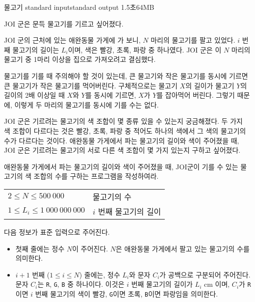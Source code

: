 \begin{problem}{물고기}
	{standard input}{standard output}
	{1.5초}{64MB}{}
	
	JOI 군은 문득 물고기를 기르고 싶어졌다.
	
	JOI 군의 근처에 있는 애완동물 가게에 가 보니, $N$ 마리의 물고기를 팔고 있었다. $i$ 번째 물고기의 길이는 $L_i$이며, 색은 빨강, 초록, 파랑 중 하나였다. JOI 군은 이 $N$ 마리의 물고기 중 1마리 이상을 집으로 가져오려고 결심했다.
	
	물고기를 기를 때 주의해야 할 것이 있는데, 큰 물고기와 작은 물고기를 동시에 기르면 큰 물고기가 작은 물고기를 먹어버린다. 구체적으로는 물고기 $X$의 길이가 물고기 $Y$의 길이의 2배 이상일 때 $X$와 $Y$를 동시에 기르면, $X$가 $Y$를 잡아먹어 버린다. 그렇기 때문에, 이렇게 두 마리의 물고기를 동시에 기를 수는 없다.
	
	JOI 군은 기르려는 물고기의 색 조합이 몇 종류 있을 수 있는지 궁금해졌다. 두 가지 색 조합이 다르다는 것은 빨강, 초록, 파랑 중 적어도 하나의 색에서 그 색의 물고기의 수가 다르다는 것이다. 애완동물 가게에서 파는 물고기의 길이와 색이 주어졌을 때, JOI 군은 기르려는 물고기의 서로 다른 색 조합이 몇 가지 있는지 구하고 싶어졌다.
	
	애완동물 가게에서 파는 물고기의 길이와 색이 주어졌을 때, JOI군이 기를 수 있는 물고기의 색 조합의 수를 구하는 프로그램을 작성하여라.
	
	
	
	\Constraints
	
	
	\begin{tabular}{ll}
		$2 \le N \le 500\ 000$ & 물고기의 수 \\
		$1 \le L_i \le 1\ 000\ 000\ 000$ & 	$i$ 번째 물고기의 길이 \\
	\end{tabular}
	
	
	\InputFile
	
	다음 정보가 표준 입력으로 주어진다.
	
	\begin{itemize}
		\item 첫째 줄에는 정수 $N$이 주어진다. $N$은 애완동물 가게에서 팔고 있는 물고기의 수를 의미한다.
		\item $i+1$ 번째 ($1 \le i \le N$) 줄에는, 정수 $L_i$와 문자 $C_i$가 공백으로 구분되어 주어진다. 문자 $C_i$는 \texttt{R}, \texttt{G}, \texttt{B} 중 하나이다. 이것은 $i$ 번째 물고기의 길이가 $L_i$ cm 이며, $C_i$가 \texttt{R}이면 $i$ 번째 물고기의 색이 빨강, \texttt{G}이면 초록, \texttt{B}이면 파랑임을 의미한다.
	\end{itemize}
	

\end{problem}
